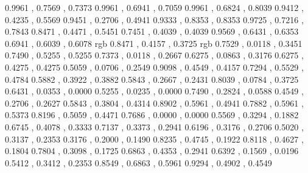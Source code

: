 ﻿\definecolor{ikkonzome}{rgb}	{	0.9961	,	0.7569	,	0.7373	}
\definecolor{ishitake}{rgb}	{	0.9961	,	0.6941	,	0.7059	}
\definecolor{momo}{rgb}	        {	0.9961	,	0.6824	,	0.8039	}
\definecolor{kobai}{rgb}	{	0.9412	,	0.4235	,	0.5569	}
\definecolor{nakabeni}{rgb}	{	0.9451	,	0.2706	,	0.4941	}
\definecolor{sakura}{rgb}	{	0.9333	,	0.8353	,	0.8353	}
\definecolor{arazome}{rgb}	{	0.9725	,	0.7216	,	0.7843	}
\definecolor{usubeni}{rgb}	{	0.8471	,	0.4471	,	0.5451	}
\definecolor{hisame}{rgb}	{	0.7451	,	0.4039	,	0.4039	}
\definecolor{toki}{rgb}	        {	0.9569	,	0.6431	,	0.6353	}
\definecolor{sakuranezumi}{rgb}	{	0.6941	,	0.6039	,	0.6078	}
\definecolor{sango}	{rgb}	{	0.8471	,	0.4157	,	0.3725	}
\definecolor{akane}	{rgb}	{	0.7529	,	0.0118	,	0.3451	}
\definecolor{choshun}{rgb}	{	0.7490	,	0.5255	,	0.5255	}
\definecolor{karakurenai}{rgb}	{	0.7373	,	0.0118	,	0.2667	}
\definecolor{enji}{rgb}	        {	0.6275	,	0.0863	,	0.3176	}
\definecolor{keshiaka}{rgb}	{	0.6275	,	0.4275	,	0.4275	}
\definecolor{kokiake}{rgb}	{	0.5059	,	0.0706	,	0.2549	}
\definecolor{jinzamomi}{rgb}	{	0.9098	,	0.4549	,	0.4157	}
\definecolor{mizugaki}{rgb}	{	0.7294	,	0.5529	,	0.4784	}
\definecolor{umenezumi}{rgb}	{	0.5882	,	0.3922	,	0.3882	}
\definecolor{suoko}{rgb}        {	0.5843	,	0.2667	,	0.2431	}
\definecolor{akabeni}{rgb}	{	0.8039	,	0.0784	,	0.3725	}
\definecolor{shinshu}{rgb}	{	0.6431	,	0.0353	,	0.0000	}
\definecolor{azuki}{rgb}	{	0.5255	,	0.0235	,	0.0000	}
\definecolor{ginshu}{rgb}	{	0.7490	,	0.2824	,	0.0588	}
\definecolor{ebicha}{rgb}	{	0.4549	,	0.2706	,	0.2627	}
\definecolor{kuriume}{rgb}	{	0.5843	,	0.3804	,	0.4314	}
\definecolor{akebono}{rgb}	{	0.8902	,	0.5961	,	0.4941	}
\definecolor{hanezu}{rgb}	{	0.7882	,	0.5961	,	0.5373	}
\definecolor{sangoshu}{rgb}	{	0.8196	,	0.5059	,	0.4471	}
\definecolor{shozyohi}{rgb}	{	0.7686	,	0.0000	,	0.0000	}
\definecolor{shikancha}{rgb}	{	0.5569	,	0.3294	,	0.1882	}
\definecolor{kakishibu}{rgb}	{	0.6745	,	0.4078	,	0.3333	}
\definecolor{benikaba}{rgb}	{	0.7137	,	0.3373	,	0.2941	}
\definecolor{benitobi}{rgb}	{	0.6196	,	0.3176	,	0.2706	}
\definecolor{benihihada}{rgb}	{	0.5020	,	0.3137	,	0.2353	}
\definecolor{kurotobi}{rgb}	{	0.3176	,	0.2000	,	0.1490	}
\definecolor{benihi}{rgb}	{	0.8235	,	0.4745	,	0.1922	}
\definecolor{terigaki}{rgb}	{	0.8118	,	0.4627	,	0.1804	}
\definecolor{ake}{rgb}	        {	0.7804	,	0.3098	,	0.1725	}
\definecolor{edocha}{rgb}	{	0.6863	,	0.4353	,	0.2941	}
\definecolor{bengara}{rgb}	{	0.6392	,	0.1569	,	0.0196	}
\definecolor{hihada}{rgb}	{	0.5412	,	0.3412	,	0.2353	}
\definecolor{shishi}{rgb}	{	0.8549	,	0.6863	,	0.5961	}
\definecolor{araishu}{rgb}	{	0.9294	,	0.4902	,	0.4549	}
